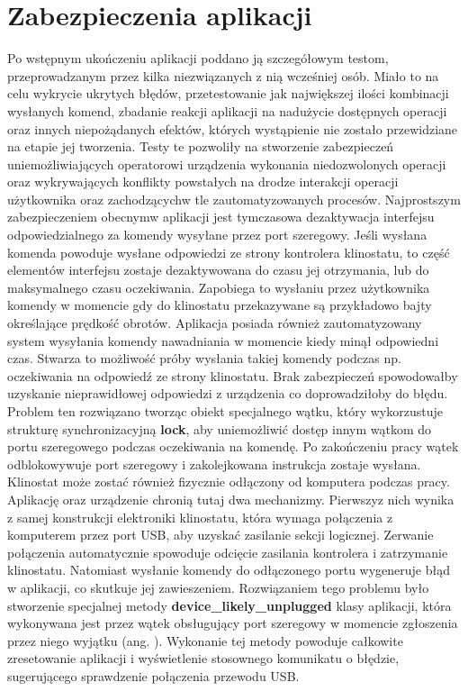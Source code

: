 \section{Zabezpieczenia aplikacji}

Po wstępnym ukończeniu aplikacji poddano ją szczegółowym testom, przeprowadzanym przez kilka niezwiązanych z nią wcześniej osób. Miało to na celu wykrycie ukrytych błędów, przetestowanie jak największej ilości kombinacji wysłanych komend, zbadanie reakcji aplikacji na nadużycie dostępnych operacji oraz innych niepożądanych efektów, których wystąpienie nie zostało przewidziane na etapie jej tworzenia. Testy te pozwoliły na stworzenie zabezpieczeń uniemożliwiających operatorowi urządzenia wykonania niedozwolonych operacji oraz wykrywających konflikty powstałych na drodze interakcji operacji użytkownika oraz zachodzących\linebreak w tle zautomatyzowanych procesów. Najprostszym zabezpieczeniem obecnym\linebreak w aplikacji jest tymczasowa dezaktywacja interfejsu odpowiedzialnego za komendy wysyłane przez port szeregowy. Jeśli wysłana komenda powoduje wysłane odpowiedzi ze strony kontrolera klinostatu, to część elementów interfejsu zostaje dezaktywowana do czasu jej otrzymania, lub do maksymalnego czasu oczekiwania. Zapobiega to wysłaniu przez użytkownika komendy w momencie gdy do klinostatu przekazywane są przykładowo bajty określające prędkość obrotów. Aplikacja posiada również zautomatyzowany system wysyłania komendy nawadniania w momencie kiedy minął odpowiedni czas. Stwarza to możliwość próby wysłania takiej komendy podczas np. oczekiwania na odpowiedź ze strony klinostatu. Brak zabezpieczeń spowodowałby uzyskanie nieprawidłowej odpowiedzi z urządzenia co doprowadziłoby do błędu. Problem ten rozwiązano tworząc obiekt specjalnego wątku, który wykorzustuje strukturę synchronizacyjną \textbf{lock}, aby uniemożliwić dostęp innym wątkom do portu szeregowego podczas oczekiwania na komendę. Po zakończeniu pracy wątek odblokowywuje port szeregowy i zakolejkowana instrukcja zostaje wysłana. Klinostat może zostać również fizycznie odłączony od komputera podczas pracy. Aplikację oraz urządzenie chronią tutaj dwa mechanizmy. Pierwszy\linebreak z nich wynika z samej konstrukcji elektroniki klinostatu, która wymaga połączenia z komputerem przez port USB, aby uzyskać zasilanie sekcji logicznej. Zerwanie połączenia automatycznie spowoduje odcięcie zasilania kontrolera i zatrzymanie klinostatu. Natomiast wysłanie komendy do odłączonego portu wygeneruje błąd w aplikacji, co skutkuje jej zawieszeniem. Rozwiązaniem tego problemu było stworzenie specjalnej metody \textbf{device\_likely\_unplugged} klasy aplikacji, która wykonywana jest przez wątek obsługujący port szeregowy w momencie zgłoszenia przez niego wyjątku (ang. ). Wykonanie tej metody powoduje całkowite zresetowanie aplikacji i wyświetlenie stosownego komunikatu o błędzie, sugerującego sprawdzenie połączenia przewodu USB.
